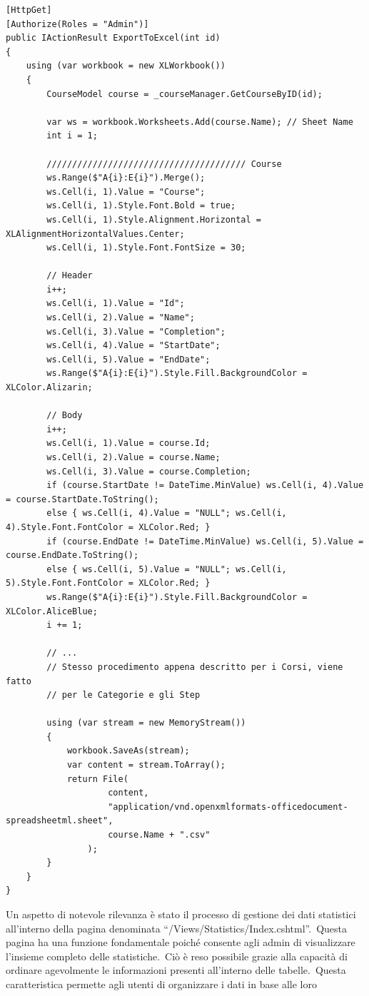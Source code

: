 \begin{lstlisting}[style=cs_style, caption=funzione utilizzata per l'esportazione in file exel]
[HttpGet]
[Authorize(Roles = "Admin")]
public IActionResult ExportToExcel(int id)
{
	using (var workbook = new XLWorkbook())
	{
		CourseModel course = _courseManager.GetCourseByID(id);

		var ws = workbook.Worksheets.Add(course.Name); // Sheet Name
		int i = 1;

		/////////////////////////////////////// Course
		ws.Range($"A{i}:E{i}").Merge();
		ws.Cell(i, 1).Value = "Course";
		ws.Cell(i, 1).Style.Font.Bold = true;
		ws.Cell(i, 1).Style.Alignment.Horizontal = XLAlignmentHorizontalValues.Center;
		ws.Cell(i, 1).Style.Font.FontSize = 30;

		// Header
		i++;
		ws.Cell(i, 1).Value = "Id";
		ws.Cell(i, 2).Value = "Name";
		ws.Cell(i, 3).Value = "Completion";
		ws.Cell(i, 4).Value = "StartDate";
		ws.Cell(i, 5).Value = "EndDate";
		ws.Range($"A{i}:E{i}").Style.Fill.BackgroundColor = XLColor.Alizarin;

		// Body
		i++;
		ws.Cell(i, 1).Value = course.Id;
		ws.Cell(i, 2).Value = course.Name;
		ws.Cell(i, 3).Value = course.Completion;
		if (course.StartDate != DateTime.MinValue) ws.Cell(i, 4).Value = course.StartDate.ToString();
		else { ws.Cell(i, 4).Value = "NULL"; ws.Cell(i, 4).Style.Font.FontColor = XLColor.Red; }
		if (course.EndDate != DateTime.MinValue) ws.Cell(i, 5).Value = course.EndDate.ToString();
		else { ws.Cell(i, 5).Value = "NULL"; ws.Cell(i, 5).Style.Font.FontColor = XLColor.Red; }
		ws.Range($"A{i}:E{i}").Style.Fill.BackgroundColor = XLColor.AliceBlue;
		i += 1;

		// ...
		// Stesso procedimento appena descritto per i Corsi, viene fatto
		// per le Categorie e gli Step 
		
		using (var stream = new MemoryStream())
		{
			workbook.SaveAs(stream);
			var content = stream.ToArray();
			return File(
					content,
					"application/vnd.openxmlformats-officedocument-spreadsheetml.sheet",
					course.Name + ".csv"
				);
		}
	}
}
\end{lstlisting}
%
Un aspetto di notevole rilevanza è stato il processo di gestione dei dati statistici all'interno della pagina denominata 
``/Views/Statistics/Index.cshtml''.\ Questa pagina ha una funzione fondamentale poiché consente agli admin di visualizzare 
l'insieme completo delle statistiche.\ Ciò è reso possibile grazie alla capacità di ordinare agevolmente le informazioni 
presenti all'interno delle tabelle.\ Questa caratteristica permette agli utenti di organizzare i dati in base alle loro 

